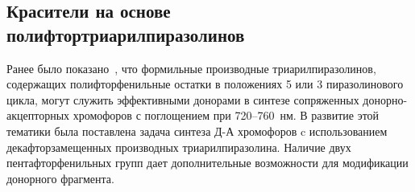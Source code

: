 



\subsection{Красители на основе полифтортриарилпиразолинов}
Ранее было показано~\cite{2019, Shelkovnikov2019}, что формильные производные триарилпиразолинов, содержащих полифторфенильные остатки в положениях 5 или 3 пиразолинового цикла, могут служить эффективными донорами в синтезе сопряженных донорно-акцепторных хромофоров с поглощением при 720--760~нм. 
В развитие этой тематики была поставлена задача синтеза Д-А хромофоров c использованием декафторзамещенных производных триарилпиразолина. Наличие двух пентафторфенильных групп дает дополнительные возможности для модификации донорного фрагмента.

